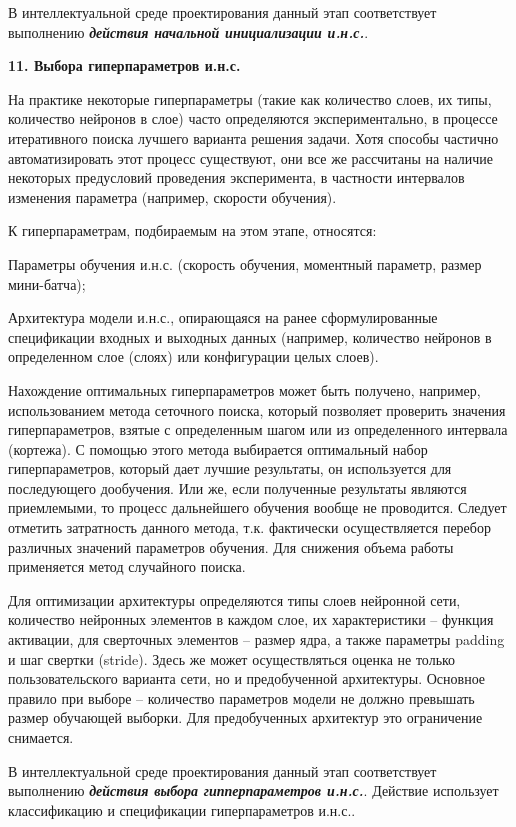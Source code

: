 В интеллектуальной среде проектирования данный этап соответствует выполнению \textbf{\textit{действия начальной инициализации и.н.с.}}.


\textbf{11. Выбора гиперпараметров и.н.с.}

На практике некоторые гиперпараметры (такие как количество слоев, их типы, количество нейронов в слое) часто определяются экспериментально, в процессе итеративного поиска лучшего варианта решения задачи. Хотя способы частично автоматизировать этот процесс существуют, они все же рассчитаны на наличие некоторых предусловий проведения эксперимента, в частности интервалов изменения параметра (например, скорости обучения).

К гиперпараметрам, подбираемым на этом этапе, относятся:
\begin{textitemize}
	\item Параметры обучения и.н.с. (скорость обучения, моментный параметр, размер мини-батча);
	\item Архитектура модели и.н.с., опирающаяся на ранее сформулированные спецификации входных и выходных данных (например, количество нейронов в определенном слое (слоях) или конфигурации целых слоев).
\end{textitemize}

Нахождение оптимальных гиперпараметров может быть получено, например, использованием метода сеточного поиска, который позволяет проверить значения гиперпараметров, взятые с определенным шагом или из определенного интервала (кортежа). С помощью этого метода выбирается оптимальный набор гиперпараметров, который дает лучшие результаты, он используется для последующего дообучения. Или же, если полученные результаты являются приемлемыми, то процесс дальнейшего обучения вообще не проводится. Следует отметить затратность данного метода, т.к. фактически осуществляется перебор различных значений параметров обучения. Для снижения объема работы применяется метод случайного поиска.

Для оптимизации архитектуры определяются типы слоев нейронной сети, количество нейронных элементов в каждом слое, их характеристики -- функция активации, для сверточных элементов -- размер ядра, а также параметры padding и шаг свертки (stride).
Здесь же может осуществляться оценка не только пользовательского варианта сети, но и предобученной архитектуры. Основное правило при выборе -- количество параметров модели не должно превышать размер обучающей выборки. Для предобученных архитектур это ограничение снимается.

В интеллектуальной среде проектирования данный этап соответствует выполнению \textbf{\textit{действия выбора гипперпараметров и.н.с.}}. Действие использует классификацию и спецификации гиперпараметров и.н.с..


